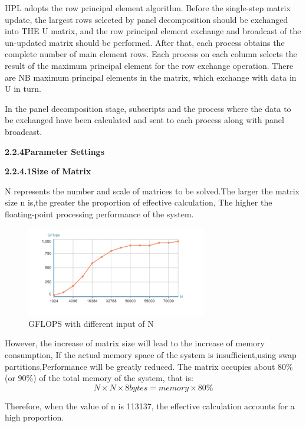 \documentclass[a4paper,12pt]{article}
\begin{document}
HPL adopts the row principal element algorithm. Before the single-step matrix update, the largest rows selected by panel decomposition should be exchanged into THE U matrix, and the row principal element exchange and broadcast of the un-updated matrix should be performed. After that, each process obtains the complete number of main element rows. Each process on each column selects the result of the maximum principal element for the row exchange operation. There are NB maximum principal elements in the matrix, which exchange with data in U in turn.

In the panel decomposition stage, subscripts and the process where the data to be exchanged have been calculated and sent to each process along with panel broadcast.

\textbf{2.2.4Parameter Settings}

\textbf{2.2.4.1Size of Matrix}

N represents the number and scale of matrices to be solved.The larger the matrix size n is,the greater the proportion of effective calculation, The higher the floating-point processing performance of the system.

\begin{figure}[H]
    \centering
    \includegraphics[width=0.7\textwidth]{GFLOPS_N.png}
    \caption{GFLOPS with different input of N}
    \label{fig:gflops_n}
\end{figure}

However, the increase of matrix size will lead to the increase of memory consumption, If the actual memory space of the system is insufficient,using swap partitions,Performance will be greatly reduced. The matrix occupies about 80\% (or 90\%) of the total memory of the system, that is:
\begin{equation*}
N \times N \times 8bytes = memory \times 80\%
\end{equation*}

Therefore, when the value of n is 113137, the effective calculation accounts for a high proportion.
\end{document}
